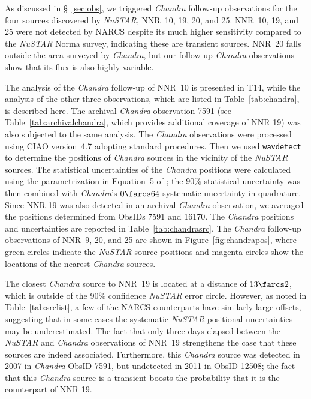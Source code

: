 \documentclass[iop,revtex4]{emulateapj}
\begin{document}
As discussed in \S~\ref{sec:obs}, we triggered \textit{Chandra} follow-up observations for the four sources discovered by \textit{NuSTAR}, NNR~10, 19, 20, and 25.  NNR~10, 19, and 25 were not detected by NARCS despite its much higher sensitivity compared to the \textit{NuSTAR} Norma survey, indicating these are transient sources.  NNR~20 falls outside the area surveyed by \textit{Chandra}, but our follow-up \textit{Chandra} observations show that its flux is also highly variable.  \par
The analysis of the \textit{Chandra} follow-up of NNR~10 is presented in T14, while the analysis of the other three observations, which are listed in Table~\ref{tab:chandra}, is described here.  The archival \textit{Chandra} observation 7591 (see Table~\ref{tab:archivalchandra}, which provides additional coverage of NNR 19) was also subjected to the same analysis.  The \textit{Chandra} observations were processed using CIAO version~4.7 adopting standard procedures.  Then we used \texttt{wavdetect} to determine the positions of \textit{Chandra} sources in the vicinity of the \textit{NuSTAR} sources.  The statistical uncertainties of the \textit{Chandra} positions were calculated using the parametrization in Equation~5 of \citet{hong05}; the 90\% statistical uncertainty was then combined with \textit{Chandra}'s $0\farcs64$ systematic uncertainty\footnotemark{} in quadrature.  Since NNR 19 was also detected in an archival \textit{Chandra} observation, we averaged the positions determined from ObsIDs 7591 and 16170.  The \textit{Chandra} positions and uncertainties are reported in Table~\ref{tab:chandrasrc}.  The \textit{Chandra} follow-up observations of NNR~9, 20, and 25 are shown in Figure~\ref{fig:chandrapos}, where green circles indicate the \textit{NuSTAR} source positions and magenta circles show the locations of the nearest \textit{Chandra} sources.\par
\par
The closest \textit{Chandra} source to NNR~19 is located at a distance of $13\farcs2$, which is outside of the 90\% confidence \textit{NuSTAR} error circle.  However, as noted in Table~\ref{tab:srclist}, a few of the NARCS counterparts have similarly large offsets, suggesting that in some cases the systematic \textit{NuSTAR} positional uncertainties may be underestimated.  The fact that only three days elapsed between the \textit{NuSTAR} and \textit{Chandra} observations of NNR~19 strengthens the case that these sources are indeed associated.  Furthermore, this \textit{Chandra} source was detected in 2007 in \textit{Chandra} ObsID 7591, but undetected in 2011 in ObsID 12508; the fact that this \textit{Chandra} source is a transient boosts the probability that it is the counterpart of NNR 19.\par
\end{document}
